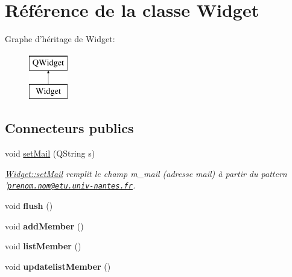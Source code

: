 \hypertarget{class_widget}{\section{Référence de la classe Widget}
\label{class_widget}
}
Graphe d'héritage de Widget\+:\begin{figure}[H]
\begin{center}
\leavevmode
\includegraphics[height=2.000000cm]{class_widget}
\end{center}
\end{figure}
\subsection*{Connecteurs publics}
\begin{DoxyCompactItemize}
\item 
void \hyperlink{class_widget_a305d97da24c5634217d536c04a05dc9f}{set\+Mail} (Q\+String s)
\begin{DoxyCompactList}\small\item\em \hyperlink{class_widget_a305d97da24c5634217d536c04a05dc9f}{Widget\+::set\+Mail} remplit le champ m\+\_\+mail (adresse mail) à partir du pattern '\href{mailto:prenom.nom@etu.univ-nantes.fr}{\tt prenom.\+nom@etu.\+univ-\/nantes.\+fr}. \end{DoxyCompactList}\item 
\hypertarget{class_widget_aa2cdb764abf57ef228bce94aa98283cd}{void {\bfseries flush} ()}\label{class_widget_aa2cdb764abf57ef228bce94aa98283cd}

\item 
\hypertarget{class_widget_a6ba5b00519d83cee3d4f744e7d2a61aa}{void {\bfseries add\+Member} ()}\label{class_widget_a6ba5b00519d83cee3d4f744e7d2a61aa}

\item 
\hypertarget{class_widget_a05e84745aa8a84f5dc93b1926adb9d09}{void {\bfseries list\+Member} ()}\label{class_widget_a05e84745aa8a84f5dc93b1926adb9d09}

\item 
\hypertarget{class_widget_a1e98071dfb4cd77ec3c6af2366ba9346}{void {\bfseries updatelist\+Member} ()}\label{class_widget_a1e98071dfb4cd77ec3c6af2366ba9346}

\end{DoxyCompactItemize}
